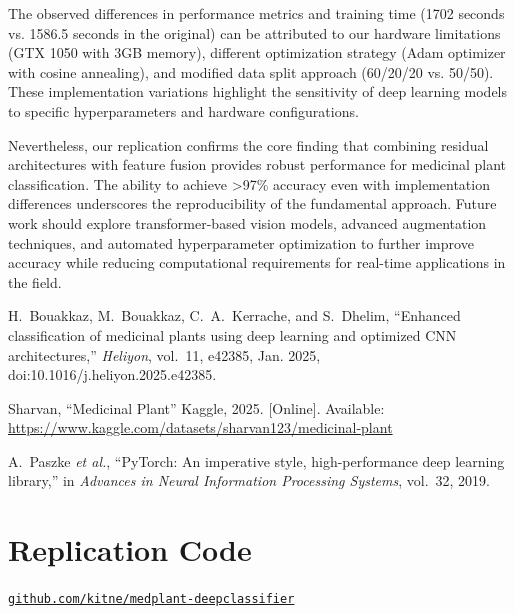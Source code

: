 \documentclass[journal,onecolumn]{IEEEtran}
\begin{document}
The observed differences in performance metrics and training time (1702 seconds vs. 1586.5 seconds in the original) can be attributed to our hardware limitations (GTX 1050 with 3GB memory), different optimization strategy (Adam optimizer with cosine annealing), and modified data split approach (60/20/20 vs. 50/50). These implementation variations highlight the sensitivity of deep learning models to specific hyperparameters and hardware configurations.

Nevertheless, our replication confirms the core finding that combining residual architectures with feature fusion provides robust performance for medicinal plant classification. The ability to achieve >97\% accuracy even with implementation differences underscores the reproducibility of the fundamental approach. Future work should explore transformer-based vision models, advanced augmentation techniques, and automated hyperparameter optimization to further improve accuracy while reducing computational requirements for real-time applications in the field.


\begin{thebibliography}{99}
    H.~Bouakkaz, M.~Bouakkaz, C.~A.~Kerrache, and S.~Dhelim, 
    “Enhanced classification of medicinal plants using deep learning and optimized CNN architectures,” 
    \textit{Heliyon}, vol.~11, e42385, Jan. 2025, doi:10.1016/j.heliyon.2025.e42385.

    Sharvan, “Medicinal Plant” Kaggle, 2025. 
    [Online]. Available: \url{https://www.kaggle.com/datasets/sharvan123/medicinal-plant}

    A.~Paszke \textit{et al.}, “PyTorch: An imperative style, high-performance deep learning library,” 
    in \textit{Advances in Neural Information Processing Systems}, vol.~32, 2019.
\end{thebibliography}
  
\appendices
\section{Replication Code}
\texttt{\href{https://github.com/kitne/medplant-deepclassifier}{github.com/kitne/medplant-deepclassifier}}
\end{document}
